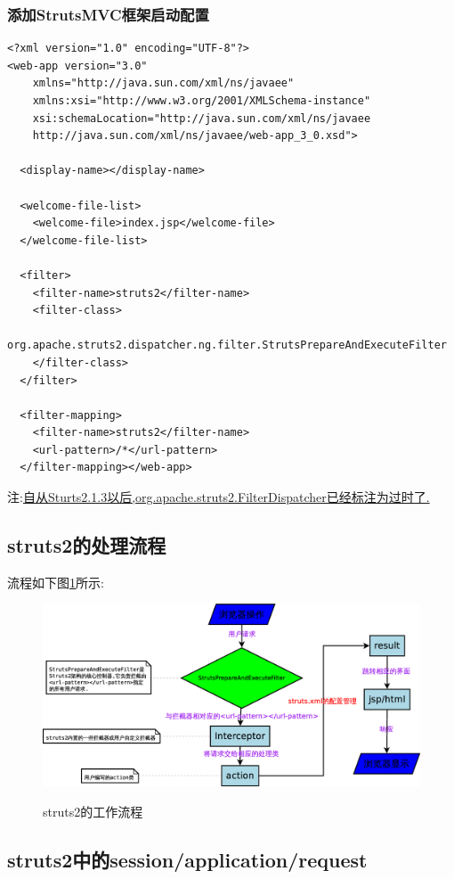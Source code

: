 \subsubsection{添加StrutsMVC框架启动配置}
\begin{lstlisting}[style=JAVA]
<?xml version="1.0" encoding="UTF-8"?>
<web-app version="3.0" 
	xmlns="http://java.sun.com/xml/ns/javaee" 
	xmlns:xsi="http://www.w3.org/2001/XMLSchema-instance" 
	xsi:schemaLocation="http://java.sun.com/xml/ns/javaee 
	http://java.sun.com/xml/ns/javaee/web-app_3_0.xsd">
	
  <display-name></display-name>	
  
  <welcome-file-list>
    <welcome-file>index.jsp</welcome-file>
  </welcome-file-list>
  
  <filter>
  	<filter-name>struts2</filter-name>
  	<filter-class>
  		org.apache.struts2.dispatcher.ng.filter.StrutsPrepareAndExecuteFilter
  	</filter-class>
  </filter>
  
  <filter-mapping>
  	<filter-name>struts2</filter-name>
  	<url-pattern>/*</url-pattern>
  </filter-mapping></web-app>
\end{lstlisting}
注:\underline{自从Sturts2.1.3以后,org.apache.struts2.FilterDispatcher已经标注为过时了.}


\subsection{struts2的处理流程}
流程如下图\ref{figs2:fig1}所示:
\begin{figure}[!htbp]
	\centering
	\caption{struts2的工作流程}
    	\includegraphics[scale=0.25]{figs/STRUTS2}
    \label{figs2:fig1}
\end{figure}


\subsection{struts2中的session/application/request}
